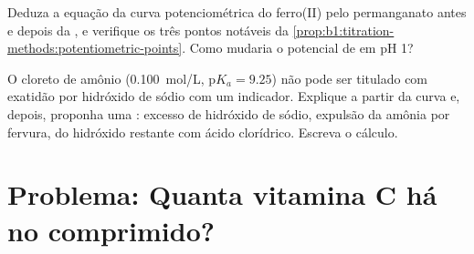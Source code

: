 \begin{exercise}[$\star\star\star$]\label{exo:b1:titration-methods:11}
Deduza a equação da curva potenciométrica do ferro(II) pelo permanganato
antes e depois da , e verifique os três pontos notáveis da
\cref{prop:b1:titration-methods:potentiometric-points}. Como mudaria o
potencial de  em pH 1?
\end{exercise}

\begin{exercise}[$\star\star\star$]\label{exo:b1:titration-methods:12}
O cloreto de amônio (\qty{0.100}{mol/L}, $\mathrm{p}K_a = 9.25$) não pode
ser titulado com exatidão por hidróxido de sódio com um indicador.
Explique a partir da curva e, depois, proponha uma :
excesso de hidróxido de sódio, expulsão da amônia por fervura, 
do hidróxido restante com ácido clorídrico. Escreva o cálculo.
\end{exercise}

\section{Problema: Quanta vitamina C há no comprimido?}

